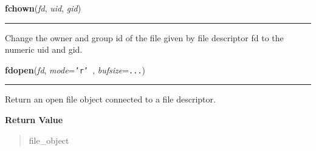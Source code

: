     \label{os:fchown}

    \vspace{0.5ex}

\hspace{.8\funcindent}\begin{boxedminipage}{\funcwidth}

    \raggedright \textbf{fchown}(\textit{fd}, \textit{uid}, \textit{gid})

    \vspace{-1.5ex}

    \rule{\textwidth}{0.5\fboxrule}
\setlength{\parskip}{2ex}
    Change the owner and group id of the file given by file descriptor fd 
    to the numeric uid and gid.

\setlength{\parskip}{1ex}
    \end{boxedminipage}

    \label{os:fdopen}

    \vspace{0.5ex}

\hspace{.8\funcindent}\begin{boxedminipage}{\funcwidth}

    \raggedright \textbf{fdopen}(\textit{fd}, \textit{mode}={\tt 'r' }, \textit{bufsize}={\tt ...})

    \vspace{-1.5ex}

    \rule{\textwidth}{0.5\fboxrule}
\setlength{\parskip}{2ex}
    Return an open file object connected to a file descriptor.

\setlength{\parskip}{1ex}
      \textbf{Return Value}
    \vspace{-1ex}

      \begin{quote}
      file\_object

      \end{quote}

    \end{boxedminipage}

    \label{os:fork}

    \vspace{0.5ex}

